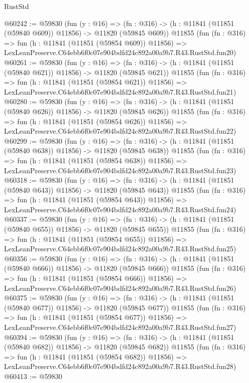 \begin{lexlean}{RustStd}
\begin{coremodule}
@60242 := @59830
    (fun (y : @16) =>
    (fn : @316) -> (h : @11841 (@11851 (@59840 @609)) @11856) -> @11820 (@59845 @609))
    @11855
    (fun (fn : @316) =>
    fun (h : @11841 (@11851 (@59854 @609)) @11856) =>
    LexLeanPreserve.C64ebb6f0c07e904bdfd24c892a00a9b7.R43.RustStd.fun20)
@60261 := @59830
    (fun (y : @16) =>
    (fn : @316) -> (h : @11841 (@11851 (@59840 @621)) @11856) -> @11820 (@59845 @621))
    @11855
    (fun (fn : @316) =>
    fun (h : @11841 (@11851 (@59854 @621)) @11856) =>
    LexLeanPreserve.C64ebb6f0c07e904bdfd24c892a00a9b7.R43.RustStd.fun21)
@60280 := @59830
    (fun (y : @16) =>
    (fn : @316) -> (h : @11841 (@11851 (@59840 @626)) @11856) -> @11820 (@59845 @626))
    @11855
    (fun (fn : @316) =>
    fun (h : @11841 (@11851 (@59854 @626)) @11856) =>
    LexLeanPreserve.C64ebb6f0c07e904bdfd24c892a00a9b7.R43.RustStd.fun22)
@60299 := @59830
    (fun (y : @16) =>
    (fn : @316) -> (h : @11841 (@11851 (@59840 @638)) @11856) -> @11820 (@59845 @638))
    @11855
    (fun (fn : @316) =>
    fun (h : @11841 (@11851 (@59854 @638)) @11856) =>
    LexLeanPreserve.C64ebb6f0c07e904bdfd24c892a00a9b7.R43.RustStd.fun23)
@60318 := @59830
    (fun (y : @16) =>
    (fn : @316) -> (h : @11841 (@11851 (@59840 @643)) @11856) -> @11820 (@59845 @643))
    @11855
    (fun (fn : @316) =>
    fun (h : @11841 (@11851 (@59854 @643)) @11856) =>
    LexLeanPreserve.C64ebb6f0c07e904bdfd24c892a00a9b7.R43.RustStd.fun24)
@60337 := @59830
    (fun (y : @16) =>
    (fn : @316) -> (h : @11841 (@11851 (@59840 @655)) @11856) -> @11820 (@59845 @655))
    @11855
    (fun (fn : @316) =>
    fun (h : @11841 (@11851 (@59854 @655)) @11856) =>
    LexLeanPreserve.C64ebb6f0c07e904bdfd24c892a00a9b7.R43.RustStd.fun25)
@60356 := @59830
    (fun (y : @16) =>
    (fn : @316) -> (h : @11841 (@11851 (@59840 @666)) @11856) -> @11820 (@59845 @666))
    @11855
    (fun (fn : @316) =>
    fun (h : @11841 (@11851 (@59854 @666)) @11856) =>
    LexLeanPreserve.C64ebb6f0c07e904bdfd24c892a00a9b7.R43.RustStd.fun26)
@60375 := @59830
    (fun (y : @16) =>
    (fn : @316) -> (h : @11841 (@11851 (@59840 @677)) @11856) -> @11820 (@59845 @677))
    @11855
    (fun (fn : @316) =>
    fun (h : @11841 (@11851 (@59854 @677)) @11856) =>
    LexLeanPreserve.C64ebb6f0c07e904bdfd24c892a00a9b7.R43.RustStd.fun27)
@60394 := @59830
    (fun (y : @16) =>
    (fn : @316) -> (h : @11841 (@11851 (@59840 @682)) @11856) -> @11820 (@59845 @682))
    @11855
    (fun (fn : @316) =>
    fun (h : @11841 (@11851 (@59854 @682)) @11856) =>
    LexLeanPreserve.C64ebb6f0c07e904bdfd24c892a00a9b7.R43.RustStd.fun28)
@60413 := @59830

\end{coremodule}
\end{lexlean}
